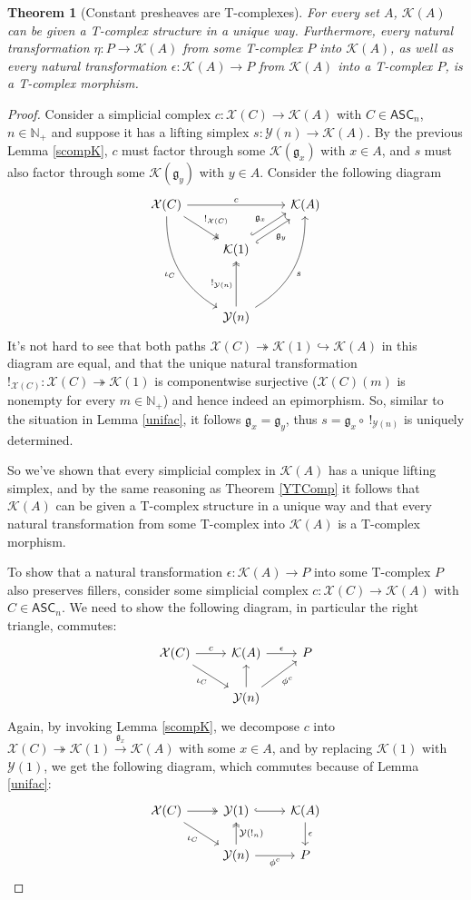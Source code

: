 \documentclass{article}
\newtheorem{theorem}{Theorem}[subsection]
\theoremstyle{remark}
\theoremstyle{definition}
\newcommand{\N}{\mathbb N}
\newcommand{\ASC}{\mathsf{ASC}}
\newcommand{\Y}{\mathcal Y}
\newcommand{\X}{\mathcal X}
\newcommand{\K}{\mathcal K}
\newcommand{\g}{\mathfrak g}
\begin{document}
	\begin{theorem}[Constant presheaves are T-complexes]\label{KTComp}
		For every set $A$, $\K(A)$ can be given a T-complex structure in a unique way. Furthermore, every natural transformation $\eta:P\to\K(A)$ from some T-complex $P$ into $\K(A)$, as well as every natural transformation $\epsilon:\K(A)\to P$ from $\K(A)$ into a T-complex $P$, is a T-complex morphism.
	\end{theorem}
	\begin{proof}
		Consider a simplicial complex $c:\X(C)\to\K(A)$ with $C\in\ASC_n$, $n\in\N_+$ and suppose it has a lifting simplex $s:\Y(n)\to\K(A)$. By the previous Lemma \ref{scompK}, $c$ must factor through some $\K(\g_x)$ with $x\in A$, and $s$ must also factor through some $\K(\g_y)$ with $y\in A$. Consider the following diagram
		\[\begin{tikzcd}
			\X(C)\arrow{rr}{c}\arrow[two heads]{dr}{!_{\X(C)}}\arrow[bend right=30]{dddr}[swap]{\iota_C}&&\K(A)\\
			&\K(1)\arrow[hook,shift left=1mm]{ur}{\g_x}\arrow[hook',shift right=1mm]{ur}[swap]{\g_y}\\\\
			&\Y(n)\arrow[two heads]{uu}{!_{\Y(n)}}\arrow[bend right=30]{uuur}[swap]{s}
		\end{tikzcd}\]
		It's not hard to see that both paths $\X(C)\twoheadrightarrow\K(1)\hookrightarrow\K(A)$ in this diagram are equal, and that the unique natural transformation $!_{\X(C)}:\X(C)\twoheadrightarrow\K(1)$ is componentwise surjective ($\X(C)(m)$ is nonempty for every $m\in\N_+$) and hence indeed an epimorphism. So, similar to the situation in Lemma \ref{unifac}, it follows $\g_x=\g_y$, thus $s=\g_x\circ\ !_{\Y(n)}$ is uniquely determined.
		
		So we've shown that every simplicial complex in $\K(A)$ has a unique lifting simplex, and by the same reasoning as Theorem \ref{YTComp} it follows that $\K(A)$ can be given a T-complex structure in a unique way and that every natural transformation from some T-complex into $\K(A)$ is a T-complex morphism.
		
		To show that a natural transformation $\epsilon:\K(A)\to P$ into some T-complex $P$ also preserves fillers, consider some simplicial complex $c:\X(C)\to\K(A)$ with $C\in\ASC_n$. We need to show the following diagram, in particular the right triangle, commutes:
		\[\begin{tikzcd}
			\X(C)\arrow{r}{c}\arrow{dr}[swap]{\iota_C}&\K(A)\arrow{r}{\epsilon}&P\\
			&\Y(n)\arrow{u}\arrow{ur}[swap]{\phi^c}
		\end{tikzcd}\]
		Again, by invoking Lemma \ref{scompK}, we decompose $c$ into $\X(C)\twoheadrightarrow\K(1)\xrightarrow{\g_x}\K(A)$ with some $x\in A$, and by replacing $\K(1)$ with $\Y(1)$, we get the following diagram, which commutes because of Lemma \ref{unifac}:
		\[\begin{tikzcd}
			\X(C)\arrow[two heads]{r}\arrow{dr}[swap]{\iota_C}&\Y(1)\arrow[hook]{r}&\K(A)\arrow{d}{\epsilon}\\
			&\Y(n)\arrow[two heads]{u}[swap]{\Y(!_n)}\arrow{r}[swap]{\phi^c}&P
		\end{tikzcd}\]
	\end{proof}
\end{document}
